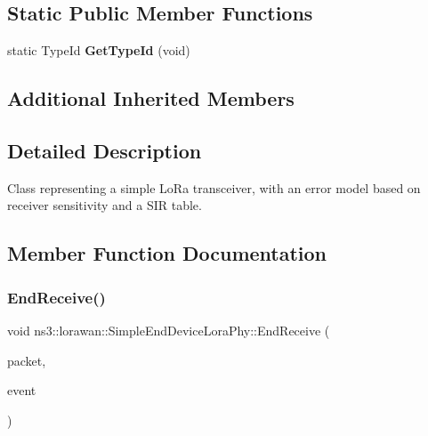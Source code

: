 \subsection*{Static Public Member Functions}
\begin{DoxyCompactItemize}
\item 
\mbox{\label{classns3_1_1lorawan_1_1SimpleEndDeviceLoraPhy_ac3cbeeff46ddb3fd0119dff15870341e}} 
static Type\+Id {\bfseries Get\+Type\+Id} (void)
\end{DoxyCompactItemize}
\subsection*{Additional Inherited Members}


\subsection{Detailed Description}
Class representing a simple Lo\+Ra transceiver, with an error model based on receiver sensitivity and a S\+IR table. 

\subsection{Member Function Documentation}
\mbox{\label{classns3_1_1lorawan_1_1SimpleEndDeviceLoraPhy_a03a9d0ffdd5f89991a61aa54e5a1e7ba}} 
\subsubsection{\texorpdfstring{End\+Receive()}{EndReceive()}}
{\footnotesize\ttfamily void ns3\+::lorawan\+::\+Simple\+End\+Device\+Lora\+Phy\+::\+End\+Receive (\begin{DoxyParamCaption}\item[{Ptr$<$ Packet $>$}]{packet,  }\item[{Ptr$<$ \hyperlink{classns3_1_1lorawan_1_1LoraInterferenceHelper_1_1Event}{Lora\+Interference\+Helper\+::\+Event} $>$}]{event }\end{DoxyParamCaption})\hspace{0.3cm}{\ttfamily [virtual]}}

